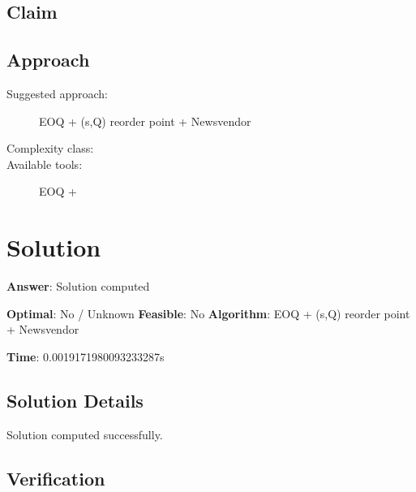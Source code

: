 \documentclass[11pt, a4paper]{article}
\begin{document}
\subsection{Claim}


\subsection{Approach}

\begin{description}
  \item[Suggested approach:] EOQ + (s,Q) reorder point + Newsvendor
  \item[Complexity class:] 
  \item[Available tools:] EOQ +
\end{description}
\section{Solution}

\begin{polyaresult}

\textbf{Answer}: Solution computed


\textbf{Optimal}: No / Unknown \hfill
\textbf{Feasible}: No
\textbf{Algorithm}: EOQ + (s,Q) reorder point + Newsvendor \quad $$

\textbf{Time}: 0.0019171980093233287s


\end{polyaresult}

\subsection{Solution Details}

Solution computed successfully.

\subsection{Verification}
\end{document}
